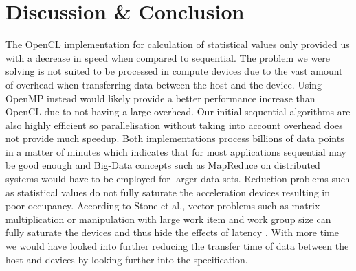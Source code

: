 
\section{Discussion \& Conclusion}

The OpenCL implementation for calculation of statistical values only provided us with a decrease in speed when compared to sequential. The problem we were solving is not suited to be processed in compute devices due to the vast amount of overhead when transferring data between the host and the device. Using OpenMP instead would likely provide a better performance increase than OpenCL due to not having a large overhead. Our initial sequential algorithms are also highly efficient so parallelisation without taking into account overhead does not provide much speedup. Both implementations process billions of data points in a matter of minutes which indicates that for most applications sequential may be good enough and Big-Data concepts such as MapReduce on distributed systems would have to be employed for larger data sets. Reduction problems such as statistical values do not fully saturate the acceleration devices resulting in poor occupancy. According to Stone et al., vector problems such as matrix multiplication or manipulation with large work item and work group size can fully saturate the devices and thus hide the effects of latency \cite{Stone2010}. With more time we would have looked into further reducing the transfer time of data between the host and devices by looking further into the specification\cite{KhronosGroup2012}.
